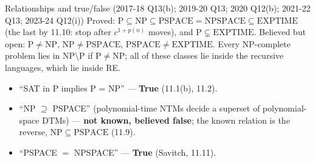 \documentclass[10.5pt,a4paper]{article}
\newcommand{\NP}{\mathrm{NP}}
\renewcommand{\P}{\mathrm{P}}
\newcommand{\PS}{\mathrm{PSPACE}}
\newcommand{\NPS}{\mathrm{NPSPACE}}
\begin{document}
\begin{ans}{Relationships and true/false (2017-18 Q13(b); 2019-20 Q13; 2020 Q12(b); 2021-22 Q13; 2023-24 Q12(i))}
Proved: $\P\subseteq\NP\subseteq\PS=\NPS\subseteq\mathrm{EXPTIME}$ (the last by 11.10: stop after $c^{1+p(n)}$ moves), and
$\P\subsetneq\mathrm{EXPTIME}$. Believed but open: $\P\ne\NP$, $\NP\ne\PS$, $\PS\ne\mathrm{EXPTIME}$.
Every NP-complete problem lies in $\NP\setminus\P$ if $\P\ne\NP$; all of these classes lie inside the recursive languages, which lie inside RE.
\begin{itemize}
\item ``SAT in P implies P = NP'' --- \textbf{True} (11.1(b), 11.2).
\item ``NP $\supseteq$ PSPACE'' (polynomial-time NTMs decide a superset of polynomial-space DTMs) --- \textbf{not known, believed false}; the
known relation is the reverse, $\NP\subseteq\PS$ (11.9).
\item ``PSPACE $=$ NPSPACE'' --- \textbf{True} (Savitch, 11.11).
\end{itemize}
\end{ans}
\end{document}

